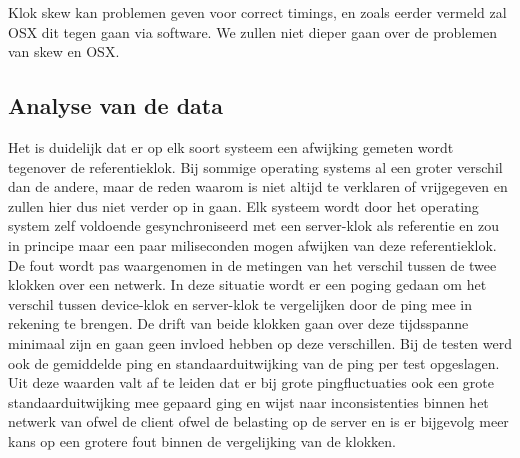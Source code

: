 Klok skew kan problemen geven voor correct timings, en zoals eerder vermeld zal OSX dit tegen gaan via software. We zullen niet dieper gaan over de problemen van skew en OSX. 


\subsection{Analyse van de data}
\label{analyse}
Het is duidelijk dat er op elk soort systeem een afwijking gemeten wordt tegenover de referentieklok. Bij sommige operating systems al een groter verschil dan de andere, maar de reden waarom is niet altijd te verklaren of vrijgegeven en zullen hier dus niet verder op in gaan. Elk systeem wordt door het operating system zelf voldoende gesynchroniseerd met een server-klok als referentie en zou in principe maar een paar miliseconden mogen afwijken van deze referentieklok. De fout wordt pas waargenomen in de metingen van het verschil tussen de twee klokken over een netwerk. In deze situatie wordt er een poging gedaan om het verschil tussen device-klok en server-klok te vergelijken door de ping mee in rekening te brengen. De drift van beide klokken gaan over deze tijdsspanne minimaal zijn en gaan geen invloed hebben op deze verschillen. Bij de testen werd ook de gemiddelde ping en standaarduitwijking van de ping per test opgeslagen. Uit deze waarden valt af te leiden dat er bij grote pingfluctuaties ook een grote standaarduitwijking mee gepaard ging en wijst naar inconsistenties binnen het netwerk van ofwel de client ofwel de belasting op de server en is er bijgevolg meer kans op een grotere fout binnen de vergelijking van de klokken. 

